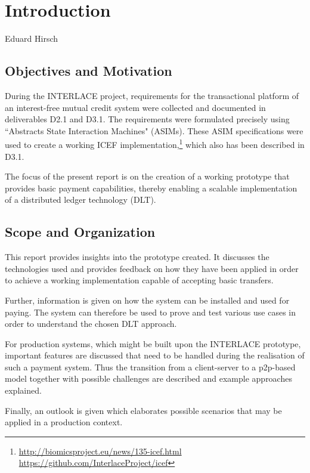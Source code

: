 \chapter{Introduction}
\label{ch:Introduction}

\vspace{-1cm}
\begin{center}
Eduard Hirsch
\end{center}


\section{Objectives and Motivation}

During the INTERLACE project, requirements for the transactional platform of an interest-free mutual credit system were collected and documented in deliverables D2.1\cite{INTERLACE_D21} and D3.1\cite{INTERLACE_D31}. The requirements were formulated precisely using ``Abstracts State Interaction Machines" (ASIMs). These ASIM specifications were used to create a working ICEF implementation,\footnote{\url{http://biomicsproject.eu/news/135-icef.html}\\ \url{https://github.com/InterlaceProject/icef}} which also has been described in D3.1.

The focus of the present report is on the creation of a working prototype that provides basic payment capabilities, thereby enabling a scalable implementation of a distributed ledger technology (DLT).

\section{Scope and Organization}
This report provides insights into the prototype created. It discusses the technologies used and provides feedback on how they have been applied in order to achieve a working implementation capable of accepting basic transfers.

Further, information is given on how the system can be installed and used for paying. The system can therefore be used to prove and test various use cases in order to understand the chosen DLT approach.

For production systems, which might be built upon the INTERLACE prototype, important features are discussed that need to be handled during the realisation of such a payment system. Thus the transition from a client-server to a p2p-based model together with possible challenges are described and example approaches explained.

Finally, an outlook is given which elaborates possible scenarios that may be applied in a production context.

\newpage
